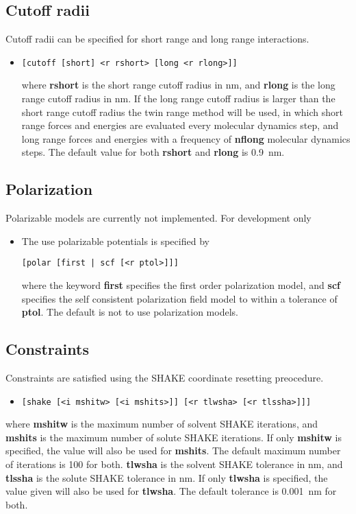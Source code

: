 \subsection{Cutoff radii}
Cutoff radii can be specified for short range and long range interactions.
\begin{itemize}
\item
\begin{verbatim}
[cutoff [short] <r rshort> [long <r rlong>]]
\end{verbatim}
where {\bf rshort} is the short range cutoff radius in nm, and {\bf rlong}
is the long range cutoff radius in nm. If the long range cutoff radius
is larger than the short range cutoff radius the twin range method will
be used, in which short range forces and energies are evaluated every
molecular dynamics step, and long range forces and energies with a
frequency of {\bf nflong} molecular dynamics steps. The default value
for both {\bf rshort} and {\bf rlong} is 0.9~nm.
\end{itemize}
\subsection{Polarization}
Polarizable models are currently not implemented. For development only
\begin{itemize}
\item
The use polarizable potentials is specified by
\begin{verbatim}
[polar [first | scf [<r ptol>]]]
\end{verbatim}
where the keyword {\bf first} specifies the first order polarization
model, and {\bf scf} specifies the self consistent polarization field
model to within a tolerance of {\bf ptol}. The default is not to
use polarization models.
\end{itemize}
\subsection{Constraints}
Constraints are satisfied using the SHAKE coordinate resetting preocedure.
\begin{itemize}
\item
\begin{verbatim}
[shake [<i mshitw> [<i mshits>]] [<r tlwsha> [<r tlssha>]]]
\end{verbatim}
\end{itemize}
where {\bf mshitw} is the maximum number of solvent SHAKE iterations,
and {\bf mshits} is the maximum number of solute SHAKE iterations. If
only {\bf mshitw} is specified, the value will also be used for {\bf mshits}.
The default maximum number of iterations is 100 for both.
{\bf tlwsha} is the solvent SHAKE tolerance in nm, and {\bf tlssha} is
the solute SHAKE tolerance in nm. If only {\bf tlwsha} is specified, the
value given will also be used for {\bf tlwsha}. The default tolerance
is 0.001~nm for both.

